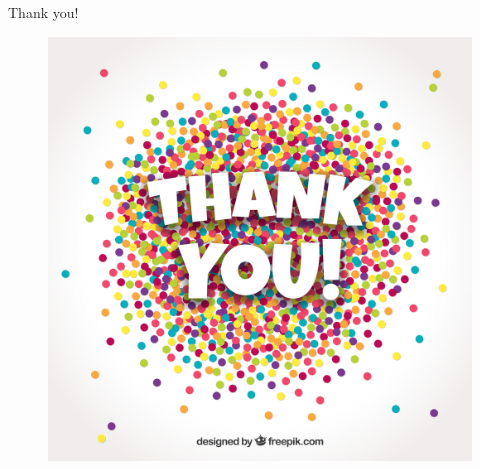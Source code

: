 \documentclass{beamer}
\begin{document}
\begin{frame}{Thank you!}
    \begin{figure}
        \centering
        \includegraphics[scale = 0.1]{Thankyou.jpg}
    \end{figure}
\end{frame}
\end{document}
